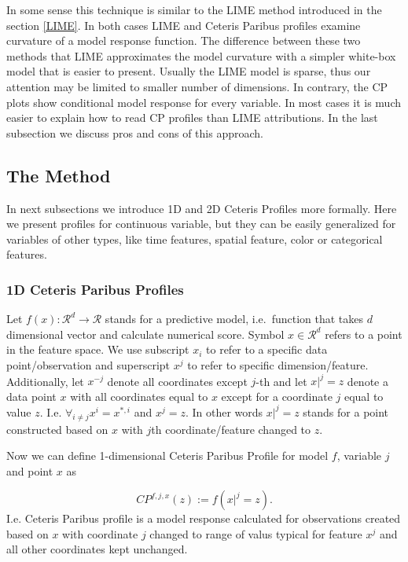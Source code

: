 \documentclass[]{krantz}
\theoremstyle{definition}
\theoremstyle{definition}
\theoremstyle{definition}
\theoremstyle{remark}
\begin{document}
In some sense this technique is similar to the LIME method introduced in
the section \ref{LIME}. In both cases LIME and Ceteris Paribus profiles
examine curvature of a model response function. The difference between
these two methods that LIME approximates the model curvature with a
simpler white-box model that is easier to present. Usually the LIME
model is sparse, thus our attention may be limited to smaller number of
dimensions. In contrary, the CP plots show conditional model response
for every variable. In most cases it is much easier to explain how to
read CP profiles than LIME attributions. In the last subsection we
discuss pros and cons of this approach.

\hypertarget{the-method}{%
\subsection{The Method}\label{the-method}}

In next subsections we introduce 1D and 2D Ceteris Profiles more
formally. Here we present profiles for continuous variable, but they can
be easily generalized for variables of other types, like time features,
spatial feature, color or categorical features.

\hypertarget{ceterisParibus1d}{%
\subsubsection{1D Ceteris Paribus Profiles}\label{ceterisParibus1d}}

Let \(f(x): \mathcal R^{d} \rightarrow \mathcal R\) stands for a
predictive model, i.e.~function that takes \(d\) dimensional vector and
calculate numerical score. Symbol \(x \in \mathcal R^d\) refers to a
point in the feature space. We use subscript \(x_i\) to refer to a
specific data point/observation and superscript \(x^j\) to refer to
specific dimension/feature. Additionally, let \(x^{-j}\) denote all
coordinates except \(j\)-th and let \(x|^j=z\) denote a data point \(x\)
with all coordinates equal to \(x\) except for a coordinate \(j\) equal
to value \(z\). I.e. \(\forall_{i \neq {j}} x^i = x^{*,i}\) and
\(x^j = z\). In other words \(x|^j=z\) stands for a point constructed
based on \(x\) with \(j\)th coordinate/feature changed to \(z\).

Now we can define 1-dimensional Ceteris Paribus Profile for model \(f\),
variable \(j\) and point \(x\) as

\[
CP^{f, j, x}(z) := f(x|^j = z).
\] I.e. Ceteris Paribus profile is a model response calculated for
observations created based on \(x\) with coordinate \(j\) changed to
range of valus typical for feature \(x^j\) and all other coordinates
kept unchanged.
\end{document}
